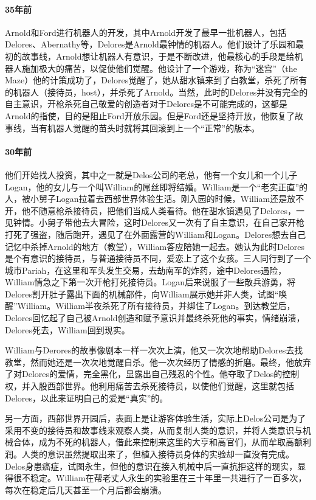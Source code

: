 \paragraph{35年前}
Arnold和Ford进行机器人的开发，其中Arnold开发了最早一批机器人，包括Delores、Abernathy等，Delores是Arnold最钟情的机器人。他们设计了乐园和最初的故事线，Arnold想让机器人有意识，于是不断改进，他最核心的手段是给机器人施加极大的痛苦，以促使他们觉醒。他设计了一个游戏，称为“迷宫”（the Maze）他的计策成功了，Delores觉醒了，她从甜水镇来到了白教堂，杀死了所有的机器人（接待员，host），并杀死了Arnold。当然，此时的Delores并没有完全的自主意识，开枪杀死自己敬爱的创造者对于Delores是不可能完成的，这都是Arnold的指使，目的是阻止Ford开放乐园。但是Ford还是坚持开放，他恢复了故事线，当有机器人觉醒的苗头时就将其回滚到上一个“正常”的版本。

\paragraph{30年前}
他们开始找人投资，其中之一就是Delos公司的老总，他有一个女儿和一个儿子Logan，他的女儿与一个叫William的屌丝即将结婚。William是一个“老实正直”的人，被小舅子Logan拉着去西部世界体验生活。刚入园的时候，William还是放不开，他不随意枪杀接待员，把他们当成人类看待。他在甜水镇遇见了Delores，一见钟情。小舅子带他去大冒险，这时Delores又一次有了自主意识，在自己家开枪打死了强盗，随后跑开，遇见了在外面露营的William和Logan。Delores想去自己记忆中杀掉Arnold的地方（教堂），William答应陪她一起去。她认为此时Delores是个有意识的接待员，与普通接待员不同，爱恋上了这个女孩。三人同行到了一个城市Pariah，在这里和军头发生交易，去劫南军的炸药，途中Delores遇险，William情急之下第一次开枪打死接待员。Logan后来说服了一些散兵游勇，将Delores割开肚子露出下面的机械部件，向William展示她并非人类，试图“唤醒”William。William半夜杀死了所有接待员，并绑住了Logan。到达教堂后，Delores回忆起了自己被Arnold创造和赋予意识并最终杀死他的事实，情绪崩溃，Delores死去，William回到现实。

William与Derores的故事像剧本一样一次次上演，他又一次次地帮助Delores去找教堂，然而她还是一次次地觉醒自杀。他一次次经历了情感的折磨。最终，他放弃了对Delores的爱情，完全黑化，显露出自己残忍的个性。他夺取了Delos的控制权，并入股西部世界。他利用痛苦去杀死接待员，以使他们觉醒，这里就包括Delores，以此来证明自己的爱是“真实”的。

另一方面，西部世界开园后，表面上是让游客体验生活，实际上Delos公司是为了采用不变的接待员和故事线来观察人类，从而复制人类的意识，并将人类意识与机械合体，成为不死的机器人，借此来控制来这里的大亨和高官们，从而牟取高额利润。人类的意识虽然提取出来了，但植入接待员身体的实验却一直没有完成。Delos身患癌症，试图永生，但他的意识在接入机械中后一直抗拒这样的现实，显得很不稳定。William在帮老丈人永生的实验里在三十年里一共进行了一百多次，每次在稳定后几天甚至一个月后都会崩溃。

